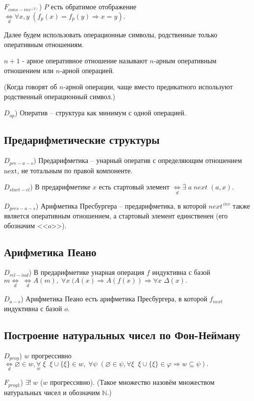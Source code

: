 \documentclass[a4paper]{article}
\newcommand{\Def}[0]{\underset{d}{\Leftrightarrow}}
\begin{document}
$F_{cons-inv^{(2)}}$) $P$ есть обратимое отображение $\Def \forall x, y\; (f_p(x) = f_p(y) \Rightarrow x = y).$

Далее будем использовать операционные символы, родственные только оперативным отношениям.

$n+1$ - арное оперативное отношение называют $n$-арным оперативным отношением или $n$-арной операцией.

(Когда говорят об $n$-арной операции, чаще вместо предикатного используют родственный операционный символ.)

$D_{op}$) Оператив -- структура как минимум с одной операцией.

\subsection{Предарифметические структуры}

$D_{pre-a-s}$) Предарифметика -- унарный оператив с определяющим отношением $\mathrm{next}$, не тотальным по правой компоненте.

$D_{start-el}$) В предарифметике $x$ есть стартовый элемент $\Def \overline{\exists}\; a \; next \; (a, x).$

$D_{pres-a-s}$) Арифметика Пресбургера -- предарифметика, в которой $next^{\,inv}$ также является оперативным отношением, а стартовый элемент единственен (его обозначим <<$o$>>).

\subsection{Арифметика Пеано}

$D_{rel-ind}$) В  предарифметике унарная операция $f$ индуктивна с базой $m \Def \; \Def A(m),\; \forall x \; (A(x) \Rightarrow A(f(x)) \Rightarrow \forall x \; \Delta(x).$

$D_{a-s}$) Арифметика Пеано есть арифметика Пресбургера, в которой $f_{next}$ индуктивна с базой $o$.

\subsection{Построение натуральных чисел по Фон-Нейману}

$D_{prog}$) $w$ прогрессивно $\Def \varnothing \in w, \underset{w}{\forall} \; \xi \;\; \xi \cup \{\xi\} \in w, \; \forall \psi \; (\varnothing \in \psi, \forall \xi \;\; \xi \cup \{\xi\} \in \varphi \Rightarrow w \subseteq \psi).$

$F_{prog1}$) $\exists ! \; w$ ($w$ прогрессивно). (Такое множество назовём множеством натуральных чисел и обозначим $\mathbb{N}$.)
\end{document}
